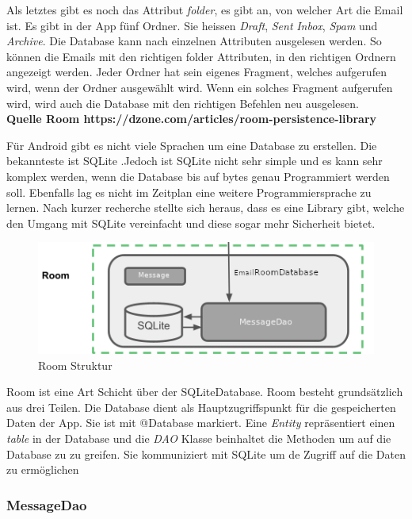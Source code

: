 \documentclass[a4paper,11pt]{article}
\begin{document}
Als letztes gibt es noch das Attribut \textit{folder}, es gibt an, von welcher Art die Email ist. Es gibt in der App fünf Ordner. Sie heissen \textit{Draft}, \textit{Sent} 
\textit{Inbox}, \textit{Spam} und \textit{Archive}. Die Database kann nach einzelnen Attributen ausgelesen werden. So können die Emails mit den richtigen
folder Attributen, in den richtigen Ordnern angezeigt werden. Jeder Ordner hat sein eigenes Fragment, welches aufgerufen wird, wenn der Ordner ausgewählt wird.
Wenn ein solches Fragment aufgerufen wird, wird auch die Database mit den richtigen Befehlen neu ausgelesen.  \\

\textbf{ Quelle Room https://dzone.com/articles/room-persistence-library}

Für Android gibt es nicht viele Sprachen um eine Database zu erstellen. Die bekannteste ist SQLite .Jedoch ist SQLite nicht sehr simple und es kann sehr komplex werden, wenn
die Database bis auf bytes genau Programmiert werden soll. Ebenfalls lag es nicht im Zeitplan eine weitere Programmiersprache zu lernen. Nach kurzer 
recherche stellte sich heraus, dass es eine Library gibt, welche den Umgang mit SQLite vereinfacht und diese sogar mehr Sicherheit bietet.\\


\begingroup
\setlength{\intextsep}{10pt}
\setlength{\columnsep}{15pt}

\begin{figure}
    \centering
    \includegraphics[width=.4\textwidth]{media/RoomStructure.png}
    \caption{Room Struktur}
\end{figure}


Room ist eine Art Schicht über der SQLiteDatabase. 
Room besteht grundsätzlich aus drei Teilen. Die Database dient als Hauptzugriffspunkt für die gespeicherten Daten der App. Sie ist mit @Database markiert. 
Eine \textit{Entity} repräsentiert einen \textit{table} in der Database und die \textit{DAO} Klasse beinhaltet die Methoden um auf die Database zu zu greifen. Sie kommuniziert
mit SQLite um de Zugriff auf die Daten zu ermöglichen 


\subsubsection{MessageDao}
\end{document}
